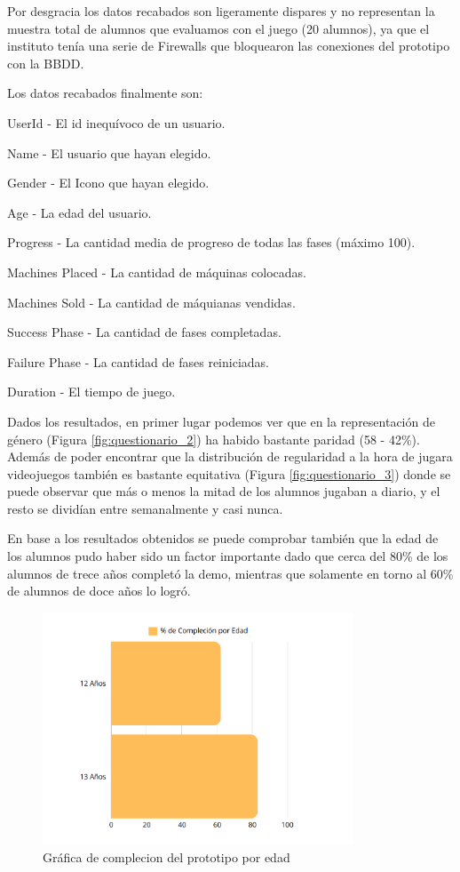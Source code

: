Por desgracia los datos recabados son ligeramente dispares y no representan la muestra total de alumnos que evaluamos con el juego (20 alumnos), ya que el instituto tenía una serie de Firewalls que bloquearon las conexiones del prototipo con la BBDD.

Los datos recabados finalmente son:

\begin{compactitem}
    \item User\textunderscore Id - El id inequívoco de un usuario.
    \item Name - El usuario que hayan elegido.
    \item Gender - El Icono que hayan elegido.
    \item Age - La edad del usuario.
    \item Progress - La cantidad media de progreso de todas las fases (máximo 100).
    \item Machines Placed - La cantidad de máquinas colocadas.
    \item Machines Sold - La cantidad de máquianas vendidas.
    \item Success Phase - La cantidad de fases completadas.
    \item Failure Phase - La cantidad de fases reiniciadas.
    \item Duration - El tiempo de juego.
\end{compactitem}

Dados los resultados, en primer lugar podemos ver que en la representación de género (Figura \ref{fig:questionario_2}) ha habido bastante
 paridad (58 - 42\%). Además de poder encontrar que la distribución de regularidad a la hora de jugara videojuegos también 
 es bastante equitativa (Figura \ref{fig:questionario_3}) donde se puede observar que más o menos la mitad de los alumnos 
 jugaban a diario, y el resto se dividían entre semanalmente y casi nunca.

En base a los resultados obtenidos se puede comprobar también que la edad de los alumnos pudo haber sido un factor importante dado que cerca del 80\% de los alumnos de trece años completó la demo, mientras que solamente en torno al 60\% de alumnos de doce años lo logró.   

 \begin{figure}[H]
    \centering
      \includegraphics[width=350px,clip=true]{complecionporedad.png}
    \caption{Gráfica de complecion del prototipo por edad}
    \label{fig:paridad}
  \end{figure}

